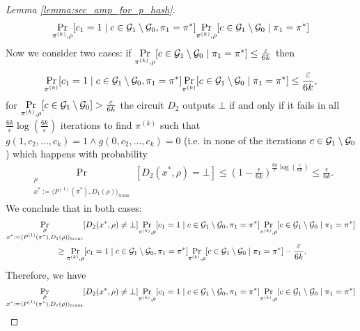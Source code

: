 \begin{proof}[Lemma \ref{lemma:sec_amp_for_p_hash}]
\begin{align}
  \underset{\pi^{(k)}, \rho}{\Pr}[c_1 = 1 \mid c \in \mathcal{G}_1 \setminus \mathcal{G}_0, \pi_1 = \pi^*]
  \underset{\pi^{(k)}, \rho}{\Pr}[c \in \mathcal{G}_1 \setminus \mathcal{G}_0 \mid \pi_1 = \pi^*]
\end{align}
Now we consider two cases:
if $\underset{\pi^{(k)}, \rho}{\Pr}[ c \in \mathcal{G}_1 \setminus \mathcal{G}_0 \mid \pi_1 = \pi^*] \leq \frac{\varepsilon}{6k}$ then
\begin{align}
  \underset{\pi^{(k)}}{\Pr}[c_1 = 1 \mid c \in \mathcal{G}_1 \setminus \mathcal{G}_0, \pi_1 = \pi^*] \underset{\pi^{(k)}}{\Pr}[c \in \mathcal{G}_1 \setminus \mathcal{G}_0 \mid \pi_1 = \pi^*] \leq \frac{\varepsilon}{6k},
\end{align}
for $\underset{\pi^{(k)}, \rho}{\Pr}[c \in \mathcal{G}_1 \setminus \mathcal{G}_0] > \frac{\varepsilon}{6k}$ the circuit $D_2$ outputs $\bot$
if and only if it fails in all $\frac{6k}{\epsilon} \log(\frac{6k}{\epsilon})$ iterations to find $\pi^{(k)}$ such that $g(1, c_2, \dots, c_k) = 1 \land g(0, c_2, \dots, c_k) = 0$
(i.e. in none of the iterations $c \in \mathcal{G}_1 \setminus \mathcal{G}_0$) which happens with probability
\begin{align}
\underset{\substack{\rho \\ x^* := \langle P^{(1)}(\pi^*), D_1(\rho) \rangle_{\text{trans}}}}{\Pr}[D_2(x^*,\rho) = \bot]
\leq (1 - \frac{\epsilon}{6k})^{\frac{6k}{\epsilon}\log(\frac{\epsilon}{6k})} \leq \frac{\epsilon}{6k}.
\end{align}
We conclude that in both cases:
\begin{align}
  &\underset{\substack{\rho \\ x^* := \langle P^{(1)}(\pi^*), D_1(\rho) \rangle_{\text{trans}}}}{\Pr}[D_2(x^*,\rho) \neq \bot]
  \underset{\pi^{(k)}, \rho}{\Pr}[c_1 = 1 \mid c \in \mathcal{G}_1 \setminus \mathcal{G}_0, \pi_1 = \pi^*]
  \underset{\pi^{(k)}, \rho}{\Pr}[c \in \mathcal{G}_1 \setminus \mathcal{G}_0 \mid \pi_1 = \pi^*] \notag\\
  &\mbox\qquad\qquad\qquad \geq \underset{\pi^{(k)}, \rho}{\Pr}[c_1 = 1 \mid c \in \mathcal{G}_1 \setminus \mathcal{G}_0, \pi_1 = \pi^*]\underset{\pi^{(k)}, \rho}{\Pr}[c \in \mathcal{G}_1 \setminus \mathcal{G}_0 \mid \pi_1 = \pi^*] - \frac{\varepsilon}{6k}.
\end{align}
Therefore, we have
\begin{align*}
  &\underset{\substack{\rho \\ x^* := \langle P^{(1)}(\pi^*), D_1(\rho) \rangle_{\text{trans}}}}{\Pr}[D_2(x^*,\rho) \neq \bot]
  \underset{\pi^{(k)}, \rho}{\Pr}[c_1 = 1 \mid c \in \cG_1 \setminus \cG_0, \pi_1 = \pi^*]
  \underset{\pi^{(k)}, \rho}{\Pr}[c \in \cG_1 \setminus \cG_0 \mid \pi_1 = \pi^*] \notag\\

\end{align*}
\end{proof}

